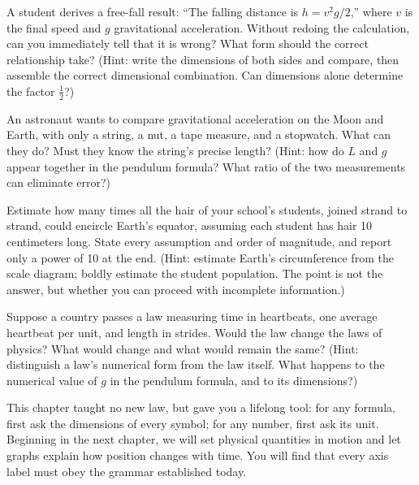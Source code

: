 \begin{puzzles}
\item A student derives a free-fall result: ``The falling distance is $h = v^2 g / 2$,'' where $v$ is the final speed and $g$ gravitational acceleration. Without redoing the calculation, can you immediately tell that it is wrong? What form should the correct relationship take? (Hint: write the dimensions of both sides and compare, then assemble the correct dimensional combination. Can dimensions alone determine the factor $\frac{1}{2}$?)
\item An astronaut wants to compare gravitational acceleration on the Moon and Earth, with only a string, a nut, a tape measure, and a stopwatch. What can they do? Must they know the string's precise length? (Hint: how do $L$ and $g$ appear together in the pendulum formula? What ratio of the two measurements can eliminate error?)
\item Estimate how many times all the hair of your school's students, joined strand to strand, could encircle Earth's equator, assuming each student has hair 10 centimeters long. State every assumption and order of magnitude, and report only a power of 10 at the end. (Hint: estimate Earth's circumference from the scale diagram; boldly estimate the student population. The point is not the answer, but whether you can proceed with incomplete information.)
\item Suppose a country passes a law measuring time in heartbeats, one average heartbeat per unit, and length in strides. Would the law change the laws of physics? What would change and what would remain the same? (Hint: distinguish a law's numerical form from the law itself. What happens to the numerical value of $g$ in the pendulum formula, and to its dimensions?)
\end{puzzles}

This chapter taught no new law, but gave you a lifelong tool: for any formula, first ask the dimensions of every symbol; for any number, first ask its unit. Beginning in the next chapter, we will set physical quantities in motion and let graphs explain how position changes with time. You will find that every axis label must obey the grammar established today.

